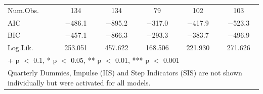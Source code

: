 \begin{table}
{\begin{tabular}[t]{lccccc}
\midrule
Num.Obs. & \num{134} & \num{134} & \num{79} & \num{102} & \num{103}\\
AIC & \num{-486.1} & \num{-895.2} & \num{-317.0} & \num{-417.9} & \num{-523.3}\\
BIC & \num{-457.1} & \num{-866.3} & \num{-293.3} & \num{-383.7} & \num{-496.9}\\
Log.Lik. & \num{253.051} & \num{457.622} & \num{168.506} & \num{221.930} & \num{271.626}\\
\bottomrule
\multicolumn{6}{l}{\rule{0pt}{1em}+ p $<$ 0.1, * p $<$ 0.05, ** p $<$ 0.01, *** p $<$ 0.001}\\
\multicolumn{6}{l}{\rule{0pt}{1em}Quarterly Dummies, Impulse (IIS) and Step Indicators (SIS) are not shown individually but were activated for all models.}\\
\end{tabular}}
\end{table}
